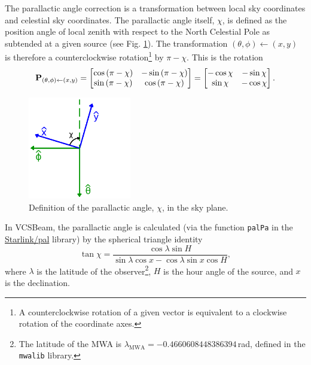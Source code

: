 \documentclass{book}
\newcommand{\vcsbeam}{{\sc VCSBeam}}
\newcommand{\transmat}[4]{\ensuremath{{\bf P}_{(#3,#4)\leftarrow(#1,#2)}}}
\begin{document}
The parallactic angle correction is a transformation between local sky coordinates and celestial sky coordinates.
The parallactic angle itself, $\chi$, is defined as the position angle of local zenith with respect to the North Celestial Pole as subtended at a given source (see Fig. \ref{fig:skyangles}).
The transformation $(\theta,\phi)\leftarrow(x,y)$ is therefore a counterclockwise rotation\footnote{A counterclockwise rotation of a given vector is equivalent to a clockwise rotation of the coordinate axes.} by $\pi - \chi$.
This is the rotation
\begin{equation}
    \transmat{x}{y}{\theta}{\phi}
        = \begin{bmatrix}
            \cos\left(\pi - \chi\right) & -\sin\left(\pi - \chi\right) \\
            \sin\left(\pi - \chi\right) &  \cos\left(\pi - \chi\right)
        \end{bmatrix}
        = \begin{bmatrix}
            -\cos\chi & -\sin\chi \\
             \sin\chi & -\cos\chi
        \end{bmatrix}.
\end{equation}
\begin{figure}[!th]
    \centering
    \includegraphics[width=0.4\textwidth]{skyangles.png}
    \caption{Definition of the parallactic angle, $\chi$, in the sky plane.}
    \label{fig:skyangles}
\end{figure}
In \vcsbeam{}, the parallactic angle is calculated (via the function \texttt{palPa} in the \href{https://github.com/Starlink/pal}{Starlink/pal} library) by the spherical triangle identity
\begin{equation}
    \tan \chi = \frac{\cos \lambda \sin H}{\sin\lambda \cos x - \cos \lambda \sin x \cos H},
\end{equation}
where $\lambda$ is the latitude of the observer\footnote{The latitude of the MWA is $\lambda_\text{MWA} = -0.4660608448386394\,$rad, defined in the \texttt{mwalib} library.}, $H$ is the hour angle of the source, and $x$ is the declination.
\end{document}
